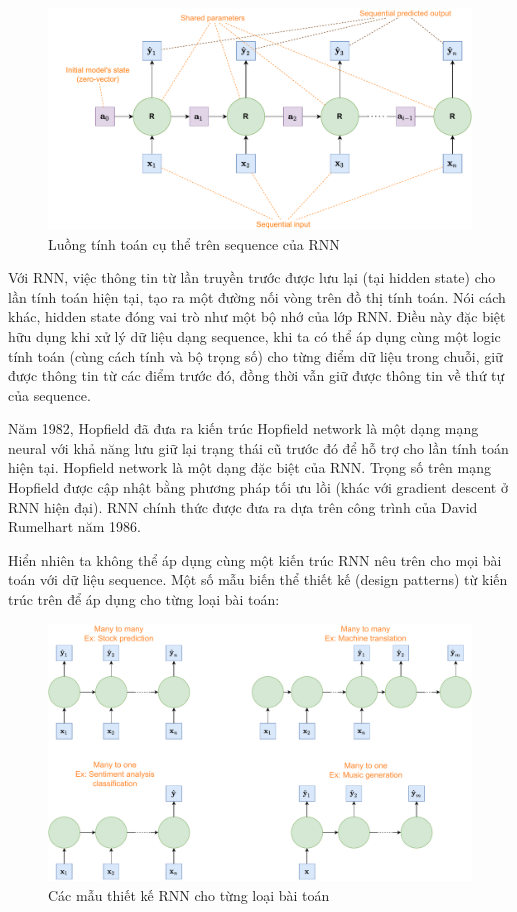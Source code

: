 \begin{figure}[!h]
    \centering
    \includegraphics[width=\textwidth,height=\textheight,keepaspectratio]{books/artificial-neural-network/chapter06/figure-sec2345/unfold_rnn.pdf}
    \caption{Luồng tính toán cụ thể trên sequence của RNN}
\end{figure}

Với RNN, việc thông tin từ lần truyền trước được lưu lại (tại hidden state) cho lần tính toán hiện tại, tạo ra một đường nối vòng trên đồ thị tính toán. Nói cách khác, hidden state đóng vai trò như một bộ nhớ của lớp RNN. Điều này đặc biệt hữu dụng khi xử lý dữ liệu dạng sequence, khi ta có thể áp dụng cùng một logic tính toán (cùng cách tính và bộ trọng số) cho từng điểm dữ liệu trong chuỗi, giữ được thông tin từ các điểm trước đó, đồng thời vẫn giữ được thông tin về thứ tự của sequence.

Năm 1982, Hopfield đã đưa ra kiến trúc Hopfield network là một dạng mạng neural với khả năng lưu giữ lại trạng thái cũ trước đó để hỗ trợ cho lần tính toán hiện tại. Hopfield network là một dạng đặc biệt của RNN. Trọng số trên mạng Hopfield được cập nhật bằng phương pháp tối ưu lồi (khác với gradient descent ở RNN hiện đại). RNN chính thức được đưa ra dựa trên công trình của David Rumelhart năm 1986.

Hiển nhiên ta không thể áp dụng cùng một kiến trúc RNN nêu trên cho mọi bài toán với dữ liệu sequence. Một số mẫu biến thể thiết kế (design patterns) từ kiến trúc trên để áp dụng cho từng loại bài toán:
\begin{figure}[!h]
    \centering
    \label{rnn_genre}
    \includegraphics[width=\textwidth,height=\textheight,keepaspectratio]{books/artificial-neural-network/chapter06/figure-sec2345/rnn_genre.pdf}
    \caption{Các mẫu thiết kế RNN cho từng loại bài toán}
\end{figure}

